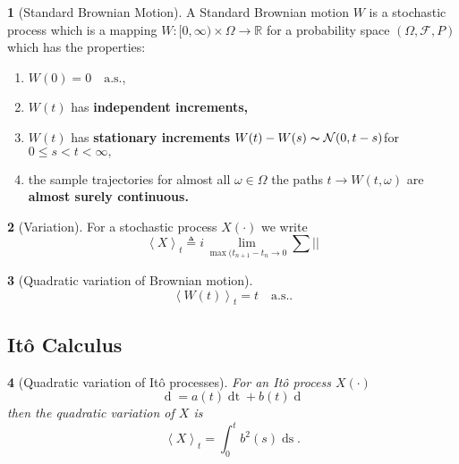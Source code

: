 \documentclass[british]{amsart}
\numberwithin{equation}{section}
\numberwithin{figure}{section}
\theoremstyle{plain}
\newtheorem{thm}{\protect\theoremname}[section]
\theoremstyle{definition}
\newtheorem{defn}[thm]{\protect\definitionname}
\theoremstyle{plain}
\theoremstyle{plain}
\theoremstyle{plain}
\theoremstyle{remark}
\theoremstyle{plain}
\providecommand{\definitionname}{Definition}
\providecommand{\theoremname}{Theorem}
\renewcommand{\d}[1]{\mathop{\mathrm{d}{#1}}}
\newcommand{\defeq}{\mathop{\triangleq}}
\newcommand{\almostsurely}{\text{a.s.}}
\begin{document}
\begin{defn} [Standard Brownian Motion]
A Standard Brownian motion $W$ is a stochastic process which is a mapping 
$W:[0,\infty)\times\Omega\to\mathbb{R}$ for a probability
space $(\Omega,\mathcal{F},P)$ which has the properties:

\begin{enumerate}
	\item $W(0)=0 \quad \almostsurely$,
	\item $W(t)$ has \textbf{independent increments,}
	\item $W(t)$ has \textbf{stationary increments} 
		$W(t)-W(s)\thicksim\mathcal{N}(0,t-s)$for $0\le s<t<\infty,$
	\item the sample trajectories for almost all $\omega\in\Omega$ the paths 
		$t\to W(t,\omega)$ are \textbf{almost surely continuous.}
\end{enumerate}
\end{defn}

\begin{defn} [Variation]
	\label{def:variation}
	For a stochastic process $X(\cdot)$ we write
	\begin{equation*}
		\left< X \right>_{t} \defeq i
			\lim_{\max{(t_{n+1}-t_{n}}\to0}
			\sum \left| \right|
	\end{equation*}
\end{defn}

\begin{thm} [Quadratic variation of Brownian motion]
	\label{thm:quadraticvariationofbrownianmotion}
	\begin{equation}
	\left<W(t)\right>_{t} = t \quad \almostsurely.
	\end{equation}
\end{thm}

\subsection{It\^{o} Calculus}

\newcommand{\msquared}{\mathcal{M}^{2}_{0,T}}

\begin{thm} 
	[Quadratic variation of It\^{o} processes]
	\label{thm:quadraticvariationofitoprocess}
	For an It\^{o} process $X(\cdot)$ 
	\begin{equation*}
		\d{X(t)} = a(t)\d{t} + b(t)\d{W(t)}
	\end{equation*}
	then the quadratic variation of $X$ is
	\begin{equation*}
		\left< X \right>_{t} = \int_{0}^{t} b^2(s)\d{s}.
	\end{equation*}
\end{thm}
\end{document}

